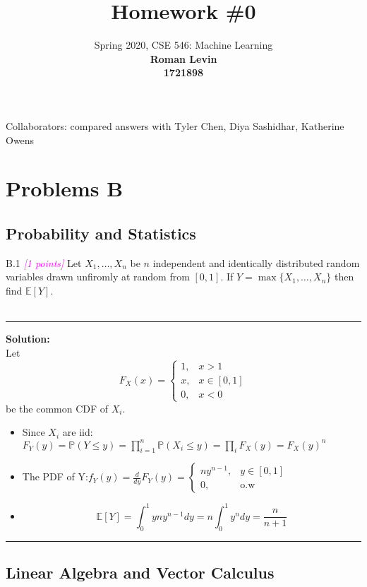\documentclass{article}
\date{{}}
\newcommand{\1}{\mathbf{1}}
\newcommand{\E}{\mathbb{E}}
\renewcommand{\P}{\mathbb{P}}
\newcommand{\points}[1]{\small\textcolor{magenta}{\emph{[#1 points]}} \normalsize}
\begin{document}
\title{Homework \#0}
\author{\normalsize{Spring 2020, CSE 546: Machine Learning}\\
\normalsize{\bf Roman Levin} \\
\normalsize{\bf 1721898} \\
}
\maketitle
Collaborators: compared answers with Tyler Chen, Diya Sashidhar, Katherine Owens
\section*{Problems B}
\subsection*{Probability and Statistics}

B.1  \points{1} Let $X_1,\dots,X_n$ be $n$ independent and identically distributed random variables drawn unfiromly at random from $[0,1]$. If $Y = \max\{X_1,\dots,X_n\}$ then find $\E[Y]$.\\
\\
    \noindent\rule{\textwidth}{1pt}
    {\bf Solution:}\\
    Let $$F_X(x) = 
    \begin{cases}
    1, & x>1\\
    x, & x\in[0,1]\\
    0, & x<0
    \end{cases}
    $$ be the common CDF of $X_i$.
    \begin{itemize}
        \item Since $X_i$ are iid: $F_Y(y) = \P(Y \leq y) = \prod_{i=1}^n\P(X_i \le y) = \prod_i F_X(y) = F_X(y)^n$
        \item The PDF of Y:$f_Y(y) = \frac{d}{dy}F_Y(y) = \begin{cases}
    ny^{n-1}, & y\in[0,1]\\
    0, & \text{o.w}
    \end{cases}  $
    \item $$\boxed{\E[Y] = \int_0^1 yny^{n-1}dy = n\int_0^1 y^{n}dy = \frac{n}{n+1} }$$
    \end{itemize}
    \noindent\rule{\textwidth}{1pt}

\subsection*{Linear Algebra and Vector Calculus}
\end{document}
